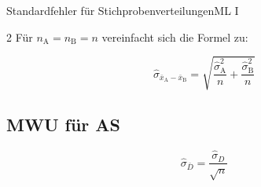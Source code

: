\begin{formulaBox}{Standardfehler für Stichprobenverteilungen}{ML I}
\begin{multicols}{2}
Für $n_\mathrm{A}=n_\mathrm{B}=n$ vereinfacht sich die Formel zu:

\[
\hat{\sigma}_{\bar{x}_\mathrm{A} - \bar{x}_\mathrm{B}}
= \sqrt{\frac{\hat{\sigma}_\mathrm{A}^2}{n}
+ \frac{\hat{\sigma}_\mathrm{B}^2}{n}}
\]

\subsection*{MWU für AS}

$$\hat{\sigma}_{\bar{D}}=\frac{\hat{\sigma}_D}{\sqrt{n}}$$

\end{multicols}
\end{formulaBox}
